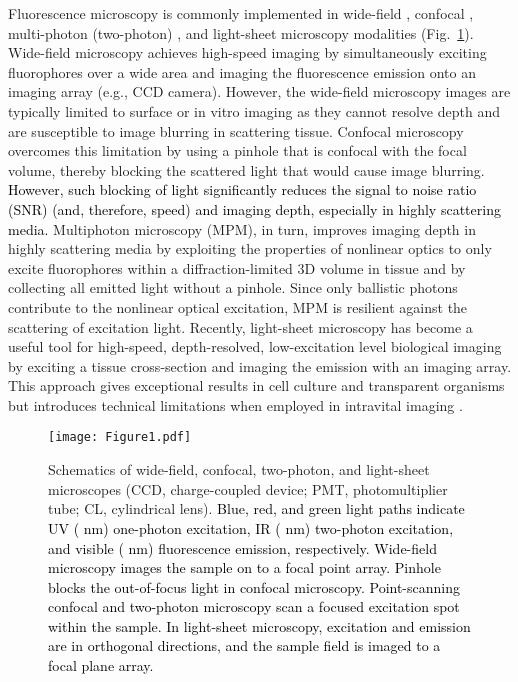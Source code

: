 \documentclass[12pt]{iopart}
\newcommand{\cc}[1]{\textcolor{black}{#1}}
\begin{document}
Fluorescence microscopy is commonly implemented in wide-field \cite{wide-field}, confocal \cite{Confocal_Handbook, ConfocalMicroscopy}, multi-photon (two-photon) \cite{MPM, NonlinearMagic}, and light-sheet microscopy modalities \cite{lightsheet} (Fig.~\ref{fig:modalities}). Wide-field microscopy achieves high-speed imaging by simultaneously exciting fluorophores over a wide area and imaging the fluorescence emission onto an imaging array (e.g., CCD camera). However, the wide-field microscopy images are typically limited to surface or in vitro imaging as they cannot resolve depth and are susceptible to image blurring in scattering tissue. Confocal microscopy overcomes this limitation by using a pinhole that is confocal with the focal volume, thereby blocking the scattered light that would cause image blurring. \cc{However, such blocking of light significantly reduces the signal to noise ratio (SNR) (and, therefore, speed) and imaging depth, especially in highly scattering media.} Multiphoton microscopy (MPM), in turn, improves imaging depth in highly scattering media by exploiting the properties of nonlinear optics to only excite fluorophores within a diffraction-limited 3D volume in tissue and by collecting all emitted light without a pinhole. Since only ballistic photons contribute to the nonlinear optical excitation, MPM is resilient against the scattering of excitation light. Recently, light-sheet microscopy has become a useful tool for high-speed, depth-resolved, low-excitation level biological imaging by exciting a tissue cross-section and imaging the emission with an imaging array. This approach gives exceptional results in cell culture and transparent organisms but introduces technical limitations when employed in intravital imaging \cite{scape,andrew}. 

\begin{figure}[!t]
	\centering
	\texttt{[image: Figure1.pdf]}
	\caption{Schematics of wide-field, confocal, two-photon, and light-sheet microscopes (CCD, charge-coupled device; PMT, photomultiplier tube; CL, cylindrical lens). \cc{Blue, red, and green light paths indicate UV ( nm) one-photon excitation, IR ( nm) two-photon excitation, and visible ( nm) fluorescence emission, respectively. Wide-field microscopy images the sample on to a focal point array. Pinhole blocks the out-of-focus light in confocal microscopy. Point-scanning confocal and two-photon microscopy scan a focused excitation spot within the sample. In light-sheet microscopy, excitation and emission are in orthogonal directions, and the sample field is imaged to a focal plane array.}}
	\label{fig:modalities}
\end{figure}
\end{document}
